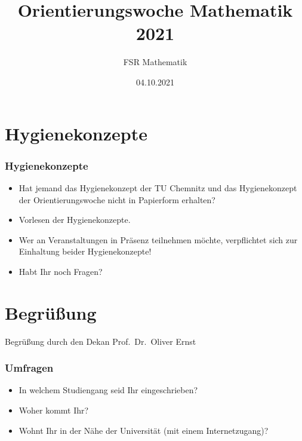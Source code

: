 \documentclass[10pt]{beamer}
\title[Orientierungswoche Mathematik 2021]{Orientierungswoche Mathematik 2021}
\author{FSR Mathematik}
\date{04.10.2021}
\institute[]{TU Chemnitz}
\makeatletter
\newcommand{\highl}[1]{\color{tuccolor@ma}#1\color{black}}
\makeatother
\begin{document}
\begingroup

\tucthreeheadlines


\endgroup

\tuctwoheadlines

\section{Hygienekonzepte}

\begin{frame}
	\frametitle{Hygienekonzepte}

	\begin{itemize}
		\item Hat jemand das Hygienekonzept der TU Chemnitz und das Hygienekonzept der Orientierungswoche nicht in Papierform erhalten?
		\item Vorlesen der Hygienekonzepte.
		\item Wer an Veranstaltungen in Präsenz teilnehmen möchte, verpflichtet sich zur Einhaltung beider Hygienekonzepte!
		\item Habt Ihr noch Fragen?
	\end{itemize}
\end{frame}


\section{Begrüßung}

\begin{frame}
	\begin{center}
		\Huge{\highl{Begrüßung durch den Dekan Prof.~Dr.~Oliver Ernst}}
	\end{center}
\end{frame}

\begin{frame}
	\frametitle{Umfragen}

	\begin{itemize}
		\item In welchem Studiengang seid Ihr eingeschrieben?
		\item Woher kommt Ihr?
		\item Wohnt Ihr in der Nähe der Universität (mit einem Internetzugang)?
	\end{itemize}
\end{frame}
\end{document}
